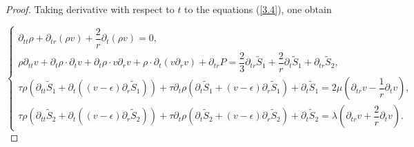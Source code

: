 \documentclass[10pt,reqno]{amsart}
\numberwithin{equation}{section}
\begin{document}
	\begin{proof}
		Taking derivative with respect to $t$ to the equations (\ref{3.4}), one obtain
		
		\begin{equation}
			\label{15}
			\begin{cases}
				\partial_{tt} \rho + \partial_{tr}(\rho v) + \dfrac{2}{r} \partial_t(\rho v) = 0, \\[6pt]
				
				\rho\partial_{tt} v + \partial_t \rho \cdot \partial_t v + \partial_t \rho \cdot v \partial_r v 
				+ \rho \cdot \partial_t( v \partial_r v) + \partial_{tr} P  = \dfrac{2}{3}\partial_{tr} \tilde{S}_1 + \dfrac{2}{r} \partial_t \tilde{S}_1 + \partial_{tr} \tilde{S}_2, \\[6pt]
				
				\tau \rho \left(\partial_{tt} \tilde{S}_1 + \partial_t ((v-\epsilon) \partial_r\tilde{S}_1) \right) 
				+ \tau \partial_t \rho \left(\partial_t \tilde{S}_1 + (v-\epsilon)\partial_r\tilde{S}_1 \right) 
				+ \partial_t \tilde{S}_1  = 2\mu\left(\partial_{tr} v - \dfrac{1}{r}\partial_t v \right), \\[6pt]
				
				\tau \rho \left(\partial_{tt} \tilde{S}_2 + \partial_t ((v-\epsilon)\partial_r\tilde{S}_2) \right) 
				+ \tau \partial_t \rho \left(\partial_t \tilde{S}_2 + (v-\epsilon)\partial_r\tilde{S}_2 \right) 
				+ \partial_t \tilde{S}_2  = \lambda \left(\partial_{tr} v + \dfrac{2}{r}\partial_t v\right).
			\end{cases}
		\end{equation}
	

\end{proof}
\end{document}
